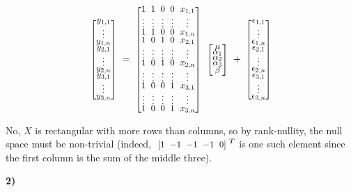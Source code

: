 \documentclass[12pt, letterpaper]{article}
\theoremstyle{definition}
\numberwithin{equation}{section}
\newcommand{\mymatrix}[1]{
	\renewcommand{\arraystretch}{0.5} 
	\setlength\arraycolsep{3pt}       
	\scalebox{0.90}{                  
		$\begin{bmatrix}
			#1
		\end{bmatrix}$
	}                   
	\renewcommand{\arraystretch}{1.0} 
	\setlength\arraycolsep{6pt}       
}
\newcommand{\+}[1]{+_{\scalebox{.375}{#1}}}
\newcommand{\1}{\mathbbm{1}}
\begin{document}
\vspace{-0.5cm}
\begin{align*}
	\mymatrix{y_{1,1}\\ \vdots \\
	y_{1,n}\\ y_{2,1} \\ \vdots \\
	y_{2,n}\\ y_{3,1} \\ \vdots \\ y_{3,n}	}=
	\mymatrix{1&1&0&0&x_{1,1}\\
	\vdots & \vdots & \vdots &\vdots &\vdots\\
	1&1&0&0&x_{1,n}\\
	1&0&1&0&x_{2,1}\\
	\vdots & \vdots & \vdots &\vdots &\vdots\\
	1&0&1&0&x_{2,n}\\
	\vdots & \vdots & \vdots &\vdots &\vdots\\
	1&0&0&1&x_{3,1}\\
	\vdots & \vdots & \vdots &\vdots &\vdots\\
	1&0&0&1&x_{3,n}}\mymatrix{\mu\\ \alpha_1 \\ \alpha_2 \\ \alpha_3 \\ \beta}+\mymatrix{
	\epsilon_{1,1} \\
	\vdots\\
	\epsilon_{1,n}\\
	\epsilon_{2,1} \\
	\vdots\\
	\epsilon_{2,n}\\
	\epsilon_{3,1} \\
	\vdots\\
	\epsilon_{3,n}
	}
\end{align*}


\vspace{\baselineskip}
\noindent\textbf{}
\vspace{\baselineskip}

No, $X$ is rectangular with more rows than columns, so by rank-nullity, the null space must be non-trivial (indeed,  $\mymatrix{1&-1&-1&-1&0}^T$ is one such element since the first column is the sum of the middle three).





\newpage
\noindent\textbf{2) }
\end{document}
